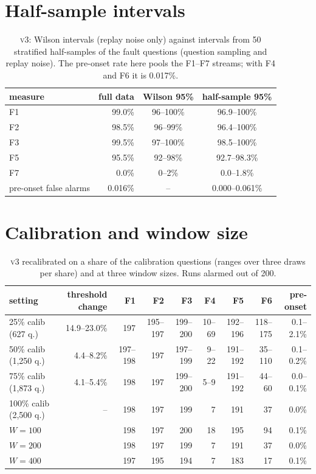 \documentclass[11pt]{article}
\newcommand{\vthree}{\textsc{v3}}
\begin{document}
\section{Half-sample intervals}
\label{app:half}
\begin{table}[h]
  \centering\small
  \caption{\vthree{}: Wilson intervals (replay noise only) against intervals from 50
  stratified half-samples of the fault questions (question sampling and replay
  noise). The pre-onset rate here pools the F1--F7 streams; with F4 and F6 it is
  0.017\%.}
  \begin{tabular}{lrcc}
    \toprule
    measure & full data & Wilson 95\% & half-sample 95\% \\
    \midrule
    F1 & 99.0\% & 96--100\% & 96.9--100\% \\
    F2 & 98.5\% & 96--99\% & 96.4--100\% \\
    F3 & 99.5\% & 97--100\% & 98.5--100\% \\
    F5 & 95.5\% & 92--98\% & 92.7--98.3\% \\
    F7 & 0.0\% & 0--2\% & 0.0--1.8\% \\
    pre-onset false alarms & 0.016\% & -- & 0.000--0.061\% \\
    \bottomrule
  \end{tabular}
\end{table}

\section{Calibration and window size}
\label{app:sens}
\begin{table}[h]
  \centering\small
  \caption{\vthree{} recalibrated on a share of the calibration questions (ranges over
  three draws per share) and at three window sizes. Runs alarmed
  out of 200.}
  \setlength{\tabcolsep}{4pt}
  \begin{tabular}{lrrrrrrrr}
    \toprule
    setting & threshold change & F1 & F2 & F3 & F4 & F5 & F6 & pre-onset \\
    \midrule
    25\% calib (627 q.) & 14.9--23.0\% & 197 & 195--197 & 199--200 & 10--69 & 192--196 & 118--175 & 0.1--2.1\% \\
    50\% calib (1{,}250 q.) & 4.4--8.2\% & 197--198 & 197 & 197--199 & 9--22 & 191--192 & 35--110 & 0.1--0.2\% \\
    75\% calib (1{,}873 q.) & 4.1--5.4\% & 198 & 197 & 199--200 & 5--9 & 191--192 & 44--60 & 0.0--0.1\% \\
    100\% calib (2{,}500 q.) & -- & 198 & 197 & 199 & 7 & 191 & 37 & 0.0\% \\
    \midrule
    $W=100$ & & 198 & 197 & 200 & 18 & 195 & 94 & 0.1\% \\
    $W=200$ & & 198 & 197 & 199 & 7 & 191 & 37 & 0.0\% \\
    $W=400$ & & 197 & 195 & 194 & 7 & 183 & 17 & 0.1\% \\
    \bottomrule
  \end{tabular}
\end{table}
\end{document}
